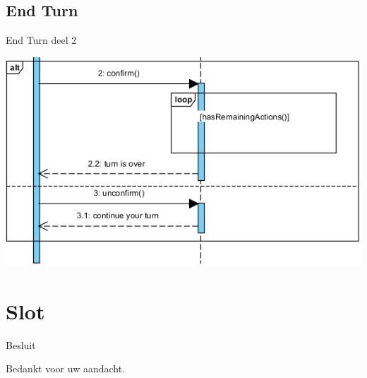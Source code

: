 \documentclass[t]{beamer}
\begin{document}
\subsection{End Turn}
\begin{frame}{End Turn deel 2}
\begin{center}
\includegraphics[scale=0.7]{images/SSDEndTurn2}
\end{center}
\end{frame}


\section{Slot}
\begin{frame}{Besluit}
\vspace{0.8in}
\begin{center}
Bedankt voor uw aandacht.
\end{center}
\end{frame}
\end{document}

